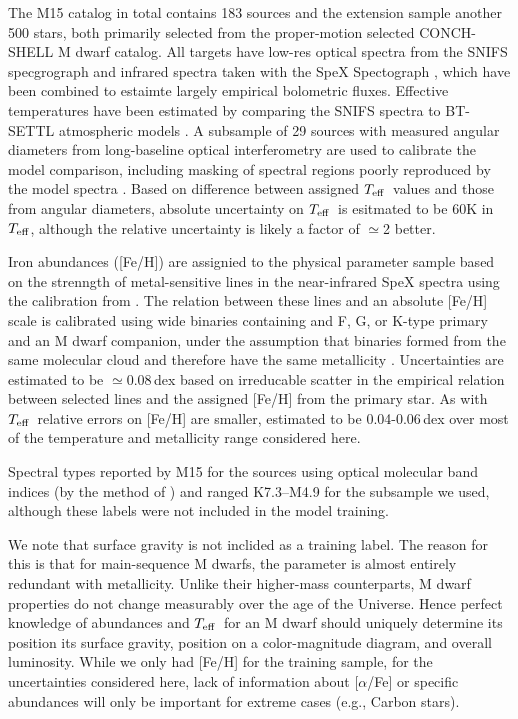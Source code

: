 \documentclass[modern]{aastex62}
\newcommand{\teff}{$T_{\rm eff}$}
\begin{document}
The M15 catalog in total contains 183 sources and the extension sample another 500 stars, both primarily selected from the proper-motion selected CONCH-SHELL \citep{Gaidos:2013} M dwarf catalog. All targets have low-res optical spectra from the SNIFS specgrograph \citep{Lantz:2004} and infrared spectra taken with the SpeX Spectograph \citep{Rayner:2003}, which have been combined to estaimte largely empirical bolometric fluxes. Effective temperatures have been estimated by comparing the SNIFS spectra to BT-SETTL atmospheric models \citep{Allard:2011}. A subsample of 29 sources with measured angular diameters from long-baseline optical interferometry \citep{Boyajian:2012} are used to calibrate the model comparison, including masking of spectral regions poorly reproduced by the model spectra \citep{Mann:2013c}. Based on difference between assigned \teff\ values and those from angular diameters, absolute uncertainty on \teff\ is esitmated to be 60K in \teff, although the relative uncertainty is likely a factor of $\simeq$2 better.

Iron abundances ([Fe/H]) are assignied to the physical parameter sample based on the strenngth of metal-sensitive lines in the near-infrared SpeX spectra \citep{RojasAyala:2010} using the calibration from \citet{Mann:2013a}. The relation between these lines and an absolute [Fe/H] scale is calibrated using wide binaries containing and F, G, or K-type primary and an M dwarf companion, under the assumption that binaries formed from the same molecular cloud and therefore have the same metallicity \citep{Bonfils:2005}. Uncertainties are estimated to be $\simeq$0.08\,dex based on irreducable scatter in the empirical relation between selected lines and the assigned [Fe/H] from the primary star. As with \teff\ relative errors on [Fe/H] are smaller, estimated to be 0.04-0.06\,dex over most of the temperature and metallicity range considered here.

Spectral types reported by M15 for the sources using optical molecular band indices (by the method of \citealt{Lepine:2013}) and ranged K7.3--M4.9 for the subsample we used, although these labels were not included in the model training.

We note that surface gravity is not inclided as a training label. The reason for this is that for main-sequence M dwarfs, the parameter is almost entirely redundant with metallicity. Unlike their higher-mass counterparts, M dwarf properties do not change measurably over the age of the Universe. Hence perfect knowledge of abundances and \teff\ for an M dwarf should uniquely determine its position its surface gravity, position on a color-magnitude diagram, and overall luminosity. While we only had [Fe/H] for the training sample, for the uncertainties considered here, lack of information about [$\alpha$/Fe] or specific abundances will only be important for extreme cases (e.g., Carbon stars). 
\end{document}

